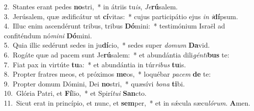 {2.~}Stantes erant pedes \textbf{no}stri,~* in átriis tu\textit{is}, \textit{Je}\textbf{rú}salem.\\
{3.~}Jerúsalem, quæ ædificátur ut \textbf{cí}vitas:~* cujus participátio ejus \textit{in} \textit{i}\textbf{dí}psum.\\
{4.~}Illuc enim ascendérunt tribus, tribus \textbf{Dó}mini:~* testimónium Israël ad confiténdum nó\textit{mi}\textit{ni} \textbf{Dó}mini.\\
{5.~}Quia illic sedérunt sedes in ju\textbf{dí}cio,~* sedes super \textit{do}\textit{mum} \textbf{Da}vid.\\
{6.~}Rogáte quæ ad pacem sunt Je\textbf{rú}salem:~* et abundántia dili\textit{gén}\textit{ti}\textbf{bus} te:\\
{7.~}Fiat pax in virtúte \textbf{tu}a:~* et abundántia in túr\textit{ri}\textit{bus} \textbf{tu}is.\\
{8.~}Propter fratres meos, et próximos \textbf{me}os,~* loquébar \textit{pa}\textit{cem} \textbf{de} te:\\
{9.~}Propter domum Dómini, Dei \textbf{no}stri,~* quæsívi \textit{bo}\textit{na} \textbf{ti}bi.\\
{10.~}Glória Patri, et \textbf{Fí}lio,~* et Spirí\textit{tu}\textit{i} \textbf{San}cto.\\
{11.~}Sicut erat in princípio, et nunc, et \textbf{sem}per,~* et in sǽcula sæcu\textit{ló}\textit{rum}. \textbf{A}men.\\
